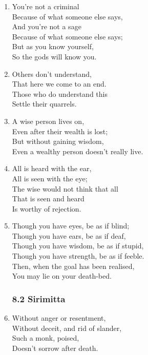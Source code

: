 \documentclass[10pt, openany]{book}
\begin{document}
\begin{enumerate}
\item You’re not a criminal \\
Because of what someone else says,\\
And you’re not a sage \\
Because of what someone else says;\\
But as you know yourself,\\
So the gods will know you.

\item Others don’t understand,\\
That here we come to an end.\\
Those who do understand this\\
Settle their quarrels.

\item A wise person lives on,\\
Even after their wealth is lost;\\
But without gaining wisdom,\\
Even a wealthy person doesn’t really live.

\item All is heard with the ear,\\
All is seen with the eye;\\
The wise would not think that all \\
That is seen and heard\\
Is worthy of rejection.

\item Though you have eyes, be as if blind;\\
Though you have ears, be as if deaf,\\
Though you have wisdom, be as if stupid,\\
Though you have strength, be as if feeble.\\
Then, when the goal has been realised,\\
You may lie on your death-bed.

\subsubsection*{8.2 Sirimitta}

\item Without anger or resentment,\\
Without deceit, and rid of slander,\\
Such a monk, poised,\\
Doesn’t sorrow after death.


\end{enumerate}
\end{document}
